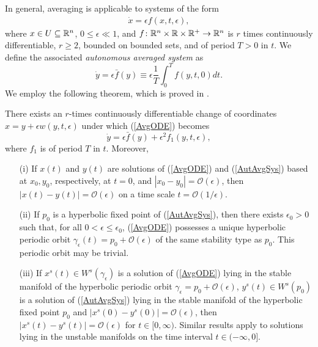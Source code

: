\documentclass[12pt]{UOthesis}
\theoremstyle{remarkstyle}
\begin{document}
In general, averaging is applicable to systems of the form
\begin{equation}
	\begin{split}
		\dot{x}=\epsilon f(x,t,\epsilon),
	\end{split}
	\label{AvgODE}
\end{equation}
where $x\in U\subseteq\mathbb R^n$, $0\le \epsilon \ll 1$, and $f\colon \mathbb R^n\times \mathbb R\times \mathbb R^+\rightarrow \mathbb R^n$ is $r$ times continuously differentiable, $r\ge 2$, bounded on bounded sets, and of period $T>0$ in $t$. We define the associated \textit{autonomous averaged system} as
\begin{equation}
	\dot{y}=\epsilon \bar{f}(y)\equiv\epsilon\frac{1}{T}\int_0^T f(y,t,0)dt.
	\label{AutAvgSys}
\end{equation}
We employ the following theorem, which is proved in \cite{GuckHolmes}.
\begin{theo}
	There exists an $r$-times continuously differentiable change of coordinates $x=y+\epsilon w(y,t,\epsilon)$ under which (\ref{AvgODE}) becomes
	\begin{equation}
		\dot{y}=\epsilon \bar{f}(y)+\epsilon^2 f_1(y,t,\epsilon),
		\label{AvgPerSys}
	\end{equation}
	where $f_1$ is of period $T$ in $t$. Moreover,
	\begin{itemize}
		\item[(i)] If $x(t)$ and $y(t)$ are solutions of (\ref{AvgODE}) and (\ref{AutAvgSys}) based at $x_0,y_0$, respectively, at $t=0$, and $|x_0-y_0|=\mathcal{O}(\epsilon)$, then $|x(t)-y(t)|=\mathcal{O}(\epsilon)$ on a time scale $t=\mathcal{O}(1/\epsilon)$.
		\item[(ii)] If $p_0$ is a hyperbolic fixed point of (\ref{AutAvgSys}), then there exists $\epsilon_0>0$ such that, for all $0<\epsilon\le \epsilon_0$, (\ref{AvgODE}) possesses a unique hyperbolic periodic orbit $\gamma_\epsilon(t)=p_0+\mathcal{O}(\epsilon)$ of the same stability type as $p_0$. This periodic orbit may be trivial.
		\item[(iii)] If $x^s(t)\in W^s(\gamma_\epsilon)$ is a solution of (\ref{AvgODE}) lying in the stable manifold of the hyperbolic periodic orbit $\gamma_\epsilon=p_0+\mathcal{O}(\epsilon)$, $y^s(t)\in W^s(p_0)$ is a solution of (\ref{AutAvgSys}) lying in the stable manifold of the hyperbolic fixed point $p_0$ and $|x^s(0)-y^s(0)|=\mathcal{O}(\epsilon)$, then $|x^s(t)-y^s(t)|=\mathcal{O}(\epsilon)$ for $t\in[0,\infty)$. Similar results apply to solutions lying in the unstable manifolds on the time interval $t\in (-\infty,0]$.
	\end{itemize}
\label{TheoAveraging}
\end{theo}
\end{document}
